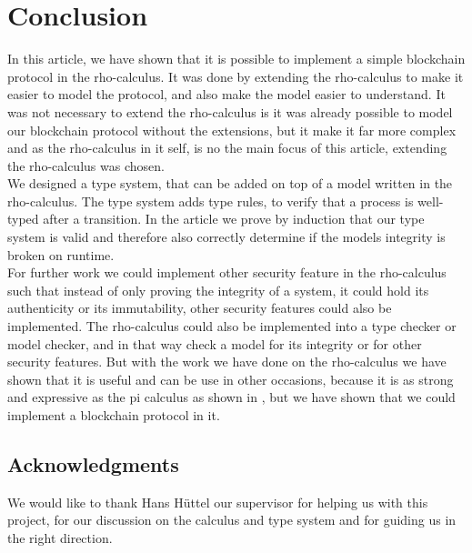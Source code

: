 \section{Conclusion}

In this article, we have shown that it is possible to implement a simple blockchain protocol in the rho-calculus. It was done by extending the rho-calculus to make it easier to model the protocol, and also make the model easier to understand. It was not necessary to extend the rho-calculus is it was already possible to model our blockchain protocol without the extensions, but it make it far more complex and as the rho-calculus in it self, is no the main focus of this article, extending the rho-calculus was chosen.\\
We designed a type system, that can be added on top of a model written in the rho-calculus. The type system adds type rules, to verify that a process is well-typed after a transition. In the article we prove by induction that our type system is valid and therefore also correctly determine if the models integrity is broken on runtime.\\


For further work we could implement other security feature in the rho-calculus such that instead of only proving the integrity of a system, it could hold its authenticity or its immutability, other security features could also be implemented. The rho-calculus could also be implemented into a type checker or model checker, and in that way check a model for its integrity or for other security features. But with the work we have done on the rho-calculus we have shown that it is useful and can be use in other occasions, because it is as strong and expressive as the pi calculus as shown in \citep{Meredith2005}, but we have shown that we could implement a blockchain protocol in it.


\subsection*{Acknowledgments}
We would like to thank Hans Hüttel our supervisor for helping us with this project, for our discussion on the calculus and type system and for guiding us in the right direction.

